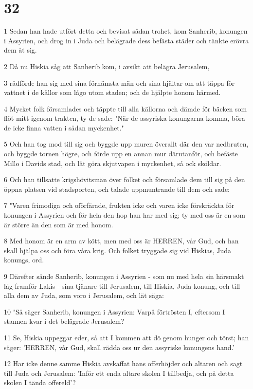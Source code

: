 \chapter{32}

\par 1 Sedan han hade utfört detta och bevisat sådan trohet, kom Sanherib, konungen i Assyrien, och drog in i Juda och belägrade dess befästa städer och tänkte erövra dem åt sig.
\par 2 Då nu Hiskia såg att Sanherib kom, i avsikt att belägra Jerusalem,
\par 3 rådförde han sig med sina förnämsta män och sina hjältar om att täppa för vattnet i de källor som lågo utom staden; och de hjälpte honom härmed.
\par 4 Mycket folk församlades och täppte till alla källorna och dämde för bäcken som flöt mitt igenom trakten, ty de sade: "När de assyriska konungarna komma, böra de icke finna vatten i sådan myckenhet."
\par 5 Och han tog mod till sig och byggde upp muren överallt där den var nedbruten, och byggde tornen högre, och förde upp en annan mur därutanför, och befäste Millo i Davids stad, och lät göra skjutvapen i myckenhet, så ock sköldar.
\par 6 Och han tillsatte krigshövitsmän över folket och församlade dem till sig på den öppna platsen vid stadsporten, och talade uppmuntrande till dem och sade:
\par 7 "Varen frimodiga och oförfärade, frukten icke och varen icke förskräckta för konungen i Assyrien och för hela den hop han har med sig; ty med oss är en som är större än den som är med honom.
\par 8 Med honom är en arm av kött, men med oss är HERREN, vår Gud, och han skall hjälpa oss och föra våra krig. Och folket tryggade sig vid Hiskias, Juda konungs, ord.
\par 9 Därefter sände Sanherib, konungen i Assyrien - som nu med hela sin härsmakt låg framför Lakis - sina tjänare till Jerusalem, till Hiskia, Juda konung, och till alla dem av Juda, som voro i Jerusalem, och lät säga:
\par 10 "Så säger Sanherib, konungen i Assyrien: Varpå förtrösten I, eftersom I stannen kvar i det belägrade Jerusalem?
\par 11 Se, Hiskia uppeggar eder, så att I kommen att dö genom hunger och törst; han säger: 'HERREN, vår Gud, skall rädda oss ur den assyriske konungens hand.'
\par 12 Har icke denne samme Hiskia avskaffat hans offerhöjder och altaren och sagt till Juda och Jerusalem: 'Inför ett enda altare skolen I tillbedja, och på detta skolen I tända offereld'?
